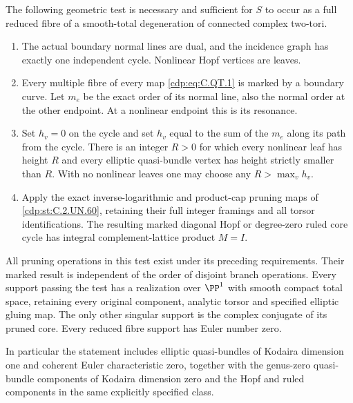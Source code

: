 \begin{proposition}
The following geometric test is necessary and sufficient for
$S$ to occur as a full reduced fibre of a smooth-total
degeneration of connected complex two-tori.
\begin{enumerate}
\item The actual boundary normal lines are dual, and the incidence
graph has exactly one independent cycle. Nonlinear Hopf vertices
are leaves.
\item Every multiple fibre of every map \eqref{cdp:eq:C.QT.1} is marked by
a boundary curve. Let $m_e$ be the exact order of its normal
line, also the normal order at the other endpoint. At a
nonlinear endpoint this is its resonance.
\item Set $h_v=0$ on the cycle and set $h_v$ equal to the sum
of the $m_e$ along its path from the cycle. There is an integer
$R>0$ for which every nonlinear leaf has height $R$ and every
elliptic quasi-bundle vertex has height strictly smaller than
$R$. With no nonlinear leaves one may choose any
$R>\max_v h_v$.
\item Apply the exact inverse-logarithmic and product-cap
pruning maps of \ref{cdp:st:C.2.UN.60}, retaining their full integer
framings and all torsor identifications. The resulting
marked diagonal Hopf or degree-zero ruled core cycle has
integral complement-lattice product $M=I$.
\end{enumerate}
All pruning operations in this test exist under its preceding
requirements. Their marked result is independent of the order
of disjoint branch operations. Every support passing the test
has a realization over $\PP^1$ with smooth compact total space,
retaining every original component, analytic torsor and
specified elliptic gluing map. The only other singular support
is the complex conjugate of its pruned core. Every reduced
fibre support has Euler number zero.

In particular the statement includes elliptic quasi-bundles
of Kodaira dimension one and coherent Euler characteristic
zero, together with the genus-zero quasi-bundle components
of Kodaira dimension zero and the Hopf and ruled components
in the same explicitly specified class.
\end{proposition}

